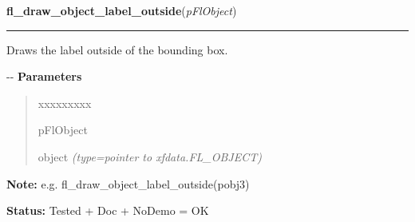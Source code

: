 \hspace{.8\funcindent}\begin{boxedminipage}{\funcwidth}

    \raggedright \textbf{fl\_draw\_object\_label\_outside}(\textit{pFlObject})

    \vspace{-1.5ex}

    \rule{\textwidth}{0.5\fboxrule}
\setlength{\parskip}{2ex}

Draws the label outside of the bounding box.

-{}-
\setlength{\parskip}{1ex}
      \textbf{Parameters}
      \vspace{-1ex}

      \begin{quote}
        \begin{Ventry}{xxxxxxxxx}

          \item[pFlObject]


object
            {\it (type=pointer to xfdata.FL\_OBJECT)}

        \end{Ventry}

      \end{quote}

\textbf{Note:} 
e.g. fl\_draw\_object\_label\_outside(pobj3)


\textbf{Status:} 
Tested + Doc + NoDemo = OK


    \end{boxedminipage}

    \label{xformslib:flbasic:fl_draw_object_label_outside}

    \vspace{0.5ex}

